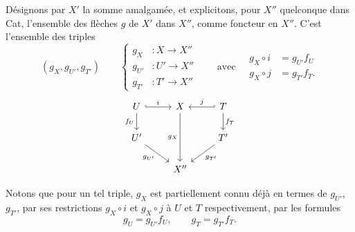 \documentclass[11pt]{article}
\newcommand{\printedpage}[1]{\marginpar{\footnotesize p.~#1}}
\begin{document}
Désignons par $X'$ la somme amalgamée, et explicitons, pour $X''$ quelconque dans Cat, l'ensemble des flèches $g$ de $X'$ dans $X''$, comme foncteur en $X''$. C'est l'ensemble des triples
\[
(g_X, g_{U'}, g_{T'}) \qquad
\left\{\begin{aligned} g_X &: X \longrightarrow X'' \\ g_{U'} &: U' \longrightarrow X'' \\ g_{T'} &: T' \longrightarrow X''\end{aligned}\right.
\qquad \text{avec} \quad
\begin{aligned} g_X\circ i &= g_{U'} f_U \\ g_X \circ j &= g_{T'} f_T. \end{aligned}
\tag*{$(*)$}
\]
\printedpage{49}
\[
\begin{tikzcd}
U \arrow[r, hook, "i"] \arrow[d, "f_U"'] & X \arrow[dd, "g_X"'] & T \arrow[l, hook', "j"'] \arrow[d, "f_T"] \\
U' \arrow[dr, "g_{U'}"'] & & T' \arrow[dl, "g_{T'}"] \\
& X'' &
\end{tikzcd}
\]

Notons que pour un tel triple, $g_X$ est partiellement connu déjà en termes de $g_{U'}$, $g_{T'}$, par ses restrictions $g_X\circ i$ et $g_X\circ j$ à $U$ et $T$ respectivement, par les formules
\[
g_U = g_{U'}f_U, \qquad g_T = g_{T'}f_T.
\]
\end{document}
